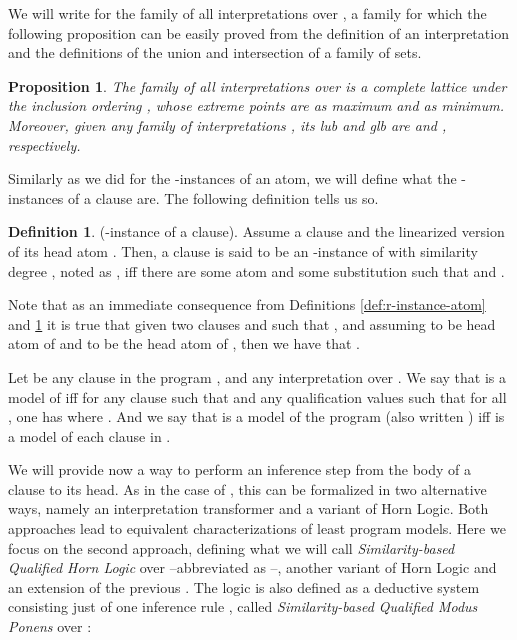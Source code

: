 \documentclass{sigplanconf}
\theoremstyle{definition}
\newtheorem{definition}{Definition}
\theoremstyle{plain}
\newtheorem{proposition}{Proposition}
\begin{document}
We will write  for the family of all interpretations over , a family for which the following proposition can be easily proved from the definition of an interpretation and the definitions of the union and intersection of a family of sets.

\begin{proposition}\label{prop:lattice}
The family  of all interpretations over  is a complete lattice under the inclusion ordering , whose extreme points are  as maximum and  as minimum. Moreover, given any family of interpretations , its lub and glb are  and , respectively.
\end{proposition}

Similarly as we did for the -instances of an atom, we will define what the -instances of a clause are. The following definition tells us so.

\begin{definition}\label{def:r-instance-clause}
(-instance of a clause). Assume a clause  and the linearized version of its head atom . Then, a clause  is said to be an -instance of  with similarity degree , noted as , iff there are some atom  and some substitution  such that   and .
\end{definition}

Note that as an immediate consequence from Definitions \ref{def:r-instance-atom} and \ref{def:r-instance-clause} it is true that given two clauses  and  such that , and assuming  to be head atom of  and  to be the head atom of , then we have that .

Let  be any clause  in the program , and  any interpretation over . We say that  is a model of  iff for any clause  such that  and any qualification values  such that  for all , one has  where . And we say that  is a model of the  program  (also written ) iff  is a model of each clause in .



We will provide now a way to perform an inference step from the body of a clause to its head. As in the case of  , this can be formalized in two alternative ways, namely an interpretation transformer and a variant of Horn Logic. Both approaches lead to equivalent characterizations of least program models. Here we focus on the second approach, defining what we will call \emph{Similarity-based Qualified Horn Logic} over  --abbreviated as --, another variant of Horn Logic and an extension of the previous . The logic  is also defined as a deductive system consisting just of one inference rule , called \emph{Similarity-based Qualified Modus Ponens} over :
\end{document}
